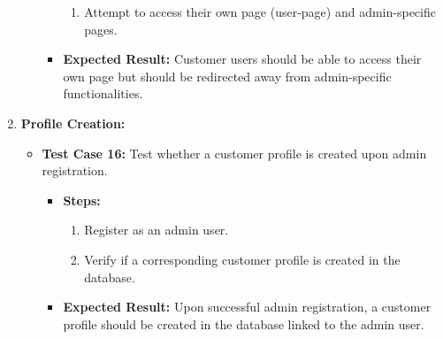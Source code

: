 \begin{enumerate}
\begin{itemize}
\begin{itemize}
\begin{enumerate}
                \item Attempt to access their own page (user-page) and admin-specific pages.
            \end{enumerate}
            \item \textbf{Expected Result:} Customer users should be able to access their own page but should be redirected away from admin-specific functionalities.
        \end{itemize}
    \end{itemize}
    \item \textbf{Profile Creation:}
        \begin{itemize}
        \item \textbf{Test Case 16:} Test whether a customer profile is created upon admin registration.
        \begin{itemize}
            \item \textbf{Steps:}
            \begin{enumerate}
                \item Register as an admin user.
                \item Verify if a corresponding customer profile is created in the database.
            \end{enumerate}
            \item \textbf{Expected Result:} Upon successful admin registration, a customer profile should be created in the database linked to the admin user.
        \end{itemize}
    \end{itemize}
\end{enumerate}

